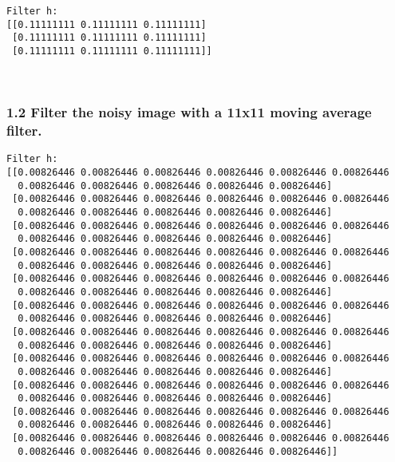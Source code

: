 \documentclass[11pt]{article}
\begin{document}
    \begin{Verbatim}[commandchars=\\\{\}]
Filter h:
[[0.11111111 0.11111111 0.11111111]
 [0.11111111 0.11111111 0.11111111]
 [0.11111111 0.11111111 0.11111111]]
    \end{Verbatim}

    \begin{center}
    \end{center}
    { \hspace*{\fill} \\}
    
    \hypertarget{filter-the-noisy-image-with-a-11x11-moving-average-filter.}{%
\subsubsection{1.2 Filter the noisy image with a 11x11 moving average
filter.}\label{filter-the-noisy-image-with-a-11x11-moving-average-filter.}}

    \begin{Verbatim}[commandchars=\\\{\}]
Filter h:
[[0.00826446 0.00826446 0.00826446 0.00826446 0.00826446 0.00826446
  0.00826446 0.00826446 0.00826446 0.00826446 0.00826446]
 [0.00826446 0.00826446 0.00826446 0.00826446 0.00826446 0.00826446
  0.00826446 0.00826446 0.00826446 0.00826446 0.00826446]
 [0.00826446 0.00826446 0.00826446 0.00826446 0.00826446 0.00826446
  0.00826446 0.00826446 0.00826446 0.00826446 0.00826446]
 [0.00826446 0.00826446 0.00826446 0.00826446 0.00826446 0.00826446
  0.00826446 0.00826446 0.00826446 0.00826446 0.00826446]
 [0.00826446 0.00826446 0.00826446 0.00826446 0.00826446 0.00826446
  0.00826446 0.00826446 0.00826446 0.00826446 0.00826446]
 [0.00826446 0.00826446 0.00826446 0.00826446 0.00826446 0.00826446
  0.00826446 0.00826446 0.00826446 0.00826446 0.00826446]
 [0.00826446 0.00826446 0.00826446 0.00826446 0.00826446 0.00826446
  0.00826446 0.00826446 0.00826446 0.00826446 0.00826446]
 [0.00826446 0.00826446 0.00826446 0.00826446 0.00826446 0.00826446
  0.00826446 0.00826446 0.00826446 0.00826446 0.00826446]
 [0.00826446 0.00826446 0.00826446 0.00826446 0.00826446 0.00826446
  0.00826446 0.00826446 0.00826446 0.00826446 0.00826446]
 [0.00826446 0.00826446 0.00826446 0.00826446 0.00826446 0.00826446
  0.00826446 0.00826446 0.00826446 0.00826446 0.00826446]
 [0.00826446 0.00826446 0.00826446 0.00826446 0.00826446 0.00826446
  0.00826446 0.00826446 0.00826446 0.00826446 0.00826446]]
    \end{Verbatim}
\end{document}
